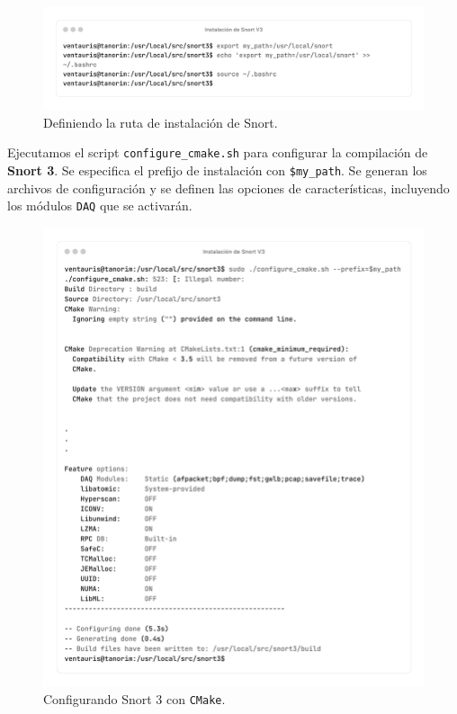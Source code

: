 \documentclass[11pt,a4paper,twoside]{report}
\begin{document}
\begin{figure}[H]
	\centering
	\includegraphics[scale=0.12]{instalacion_snort/18-18.png}
	\caption{Definiendo la ruta de instalación de Snort.}
\end{figure}

\newpage

Ejecutamos el script \texttt{configure\_cmake.sh} para configurar la compilación de \textbf{Snort 3}. Se especifica el prefijo de instalación con \texttt{\$my\_path}. Se generan los archivos de configuración y se definen las opciones de características, incluyendo los módulos \texttt{DAQ} que se activarán.

\begin{figure}[H]
	\centering
	\includegraphics[scale=0.12]{instalacion_snort/21-21.png}
	\caption{Configurando Snort 3 con \texttt{CMake}.}
\end{figure}
\end{document}
